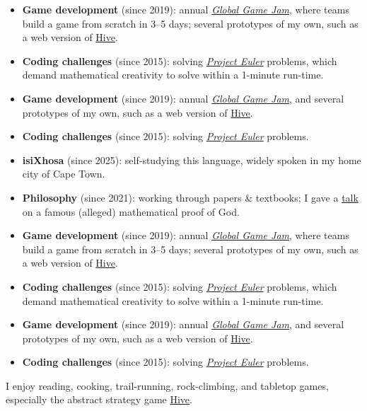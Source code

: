 
\newcommand{\codingprojects}{%
	\ifindustry %
		\item \textbf{Game development} (since 2019): annual
			\href{https://globalgamejam.org/about}{\emph{Global Game Jam}}, where teams build a game from
			scratch in 3--5 days; several prototypes of my own, such as a web version of
			\href{https://github.com/dariotrinchero/hive}{Hive}.
		\item \textbf{Coding challenges} (since 2015): solving
			\href{https://projecteuler.net/about}{\emph{Project Euler}} problems, which demand mathematical
			creativity to solve within a 1-minute run-time.
	\else %
		\item \textbf{Game development} (since 2019): annual
			\href{https://globalgamejam.org/about}{\emph{Global Game Jam}}, and several prototypes of my
			own, such as a web version of \href{https://github.com/dariotrinchero/hive}{Hive}.
		\item \textbf{Coding challenges} (since 2015): solving
			\href{https://projecteuler.net/about}{\emph{Project Euler}} problems.
	\fi %
}

\smallskip
\begin{itemize}
	\setlength{\itemsep}{0.5em}
	\ifindustry %
		\codingprojects
	\fi %
	\item \textbf{isiXhosa} (since 2025): self-studying this language, widely spoken in my home city
		of Cape Town.
	\item \textbf{Philosophy} (since 2021): working through papers \& textbooks; I gave a
		\href{https://dariotrinchero.github.io/talks/2024-08-30-modal}{talk} on a famous (alleged)
		mathematical proof of God.
	\ifindustry\else %
		\codingprojects
	\fi %
\end{itemize}

\medskip

I enjoy reading, cooking, trail-running, rock-climbing, and tabletop games, especially the abstract
strategy game \href{https://github.com/dariotrinchero/hive}{Hive}.
